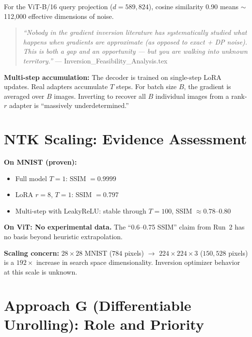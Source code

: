 \documentclass[11pt,a4paper]{article}
\newcommand{\speculated}[1]{\textcolor{speculated}{\textbf{#1}}}
\begin{document}
For the ViT-B/16 query projection ($d = 589{,}824$), cosine similarity 0.90 means $\sim$112{,}000 effective dimensions of noise.

\begin{quote}
\textit{``Nobody in the gradient inversion literature has systematically studied what happens when gradients are approximate (as opposed to exact + DP noise). This is both a gap and an opportunity --- but you are walking into unknown territory.''}
\hfill --- Inversion\_Feasibility\_Analysis.tex
\end{quote}

\textbf{Multi-step accumulation:} The decoder is trained on single-step LoRA updates. Real adapters accumulate $T$ steps. For batch size $B$, the gradient is averaged over $B$ images. Inverting to recover all $B$ individual images from a rank-$r$ adapter is ``massively underdetermined.''


\section{NTK Scaling: Evidence Assessment}

\textbf{On MNIST (proven):}
\begin{itemize}[nosep]
    \item Full model $T\!=\!1$: SSIM $= 0.9999$
    \item LoRA $r\!=\!8$, $T\!=\!1$: SSIM $= 0.797$
    \item Multi-step with LeakyReLU: stable through $T\!=\!100$, SSIM $\approx 0.78$--$0.80$
\end{itemize}

\textbf{On ViT: \speculated{No experimental data.}}
The ``0.6--0.75 SSIM'' claim from Run~2 has no basis beyond heuristic extrapolation.

\textbf{Scaling concern:} $28\!\times\!28$ MNIST ($784$ pixels) $\to$ $224\!\times\!224\!\times\!3$ ($150{,}528$ pixels) is a $192\times$ increase in search space dimensionality. Inversion optimizer behavior at this scale is unknown.


\section{Approach G (Differentiable Unrolling): Role and Priority}
\end{document}
